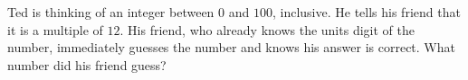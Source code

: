 Ted is thinking of an integer between $0$ and $100$, inclusive. He tells his friend that it is a multiple of $12$. His friend, who already knows the units digit of the number, immediately guesses the number and knows his answer is correct. What number did his friend guess?
